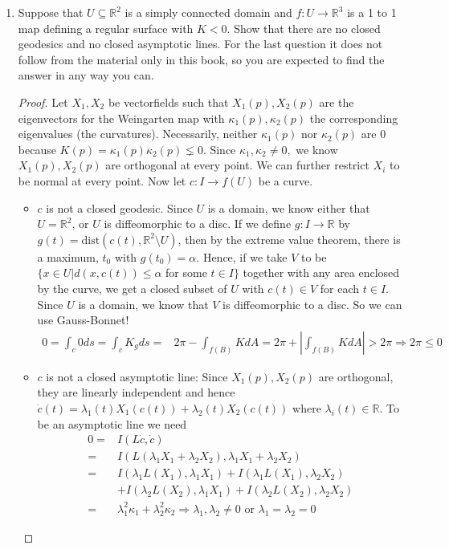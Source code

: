 \documentclass[12pt]{amsart}
\newcommand{\ka}[0]{\kappa}
\newcommand{\la}[0]{\lambda}
\begin{document}
\begin{enumerate}
\newpage
	\item Suppose that $U\subseteq\mathbb{R}^2$ is a simply connected domain and $f:U\to\mathbb{R}^3$ is a 1 to 1 map defining a regular surface with $K<0$. Show that there are no closed geodesics and no closed asymptotic lines. For the last question it does not follow from the material only in this book, so you are expected to find the answer in any way you can.
	\begin{proof}
		Let $X_1,X_2$ be vectorfields such that $X_1(p),X_2(p)$ are the eigenvectors for the Weingarten map with $\ka_1(p),\ka_2(p)$ the corresponding eigenvalues (the curvatures). Necessarily, neither $\ka_1(p)$ nor $\ka_2(p)$ are $0$ because $K(p)=\ka_1(p)\ka_2(p)\lneq0$. Since $\ka_1,\ka_2\neq0,$ we know $X_1(p),X_2(p)$ are orthogonal at every point. We can further restrict $X_i$ to be normal at every point. Now let $c:I\to f(U)$ be a curve.
		\begin{itemize}
			\item $c$ is not a closed geodesic. Since $U$ is a domain, we know either that $U=\mathbb{R}^2$, or $U$ is diffeomorphic to a disc. If we define $g:I\to\mathbb{R}$ by $g(t)=\text{dist}(c(t),\mathbb{R}^2\setminus U)$, then by the extreme value theorem, there is a maximum, $t_0$ with $g(t_0)=\alpha$. Hence, if we take $V$ to be $\{x\in U|d(x,c(t))\leq\alpha$ for some $t\in I\}$ together with any area enclosed by the curve, we get a closed subset of $U$ with $c(t)\in V$ for each $t\in I$. Since $U$ is a domain, we know that $V$ is diffeomorphic to a disc. So we can use Gauss-Bonnet!
			\begin{align*}
				0=\int_c0ds=\int_cK_gds=&2\pi-\int_{f(B)}KdA=2\pi+\left|\int_{f(B)}KdA\right|>2\pi\Rightarrow2\pi\leq0
			\end{align*}
			\item $c$ is not a closed asymptotic line: Since $X_1(p),X_2(p)$ are orthogonal, they are linearly independent and hence $\dot c(t)=\la_1(t)X_1(c(t))+\la_2(t)X_2(c(t))$ where $\la_i(t)\in\mathbb{R}$. To be an asymptotic line we need 
			\begin{align*}
				0=&I(L\dot c,\dot c)
				\\=&I(L(\la_1X_1+\la_2X_2),\la_1X_1+\la_2X_2)
				\\=&I(\la_1L(X_1),\la_1X_1)+I(\la_1L(X_1),\la_2X_2)
				\\&+I(\la_2L(X_2),\la_1X_1)+I(\la_2L(X_2),\la_2X_2)
				\\=&\la_1^2\ka_1+\la_2^2\ka_2\Rightarrow \la_1,\la_2\neq0 \text{ or } \la_1=\la_2=0
			\end{align*}
		\end{itemize}
	\end{proof}


\end{enumerate}
\end{document}
